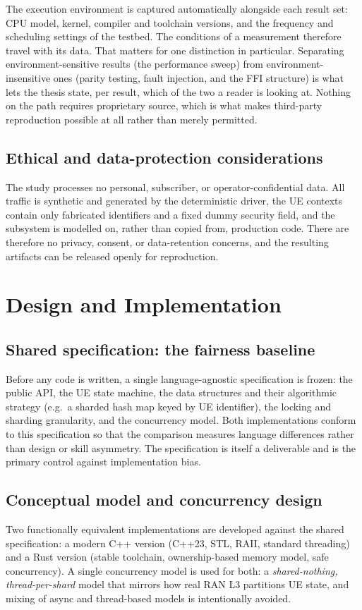 \documentclass[english,twoside,openright,a4paper,censored,csm,software-track-2020]{HYthesisML}
\begin{document}
The execution environment is captured automatically alongside each result set: CPU model,
kernel, compiler and toolchain versions, and the frequency and scheduling settings of the
testbed. The conditions of a measurement therefore travel with its data. That matters for one
distinction in particular. Separating environment-sensitive results (the performance sweep) from
environment-insensitive ones (parity testing, fault injection, and the FFI structure) is what
lets the thesis state, per result, which of the two a reader is looking at. Nothing on the path
requires proprietary source, which is what makes third-party reproduction possible at all rather
than merely permitted.

\section{Ethical and data-protection considerations}
The study processes no personal, subscriber, or operator-confidential data. All traffic is
synthetic and generated by the deterministic driver, the UE contexts contain only fabricated
identifiers and a fixed dummy security field, and the subsystem is modelled on, rather than
copied from, production code. There are therefore no privacy, consent, or data-retention
concerns, and the resulting artifacts can be released openly for reproduction.

\chapter{Design and Implementation\label{chapter:design}}

\section{Shared specification: the fairness baseline}
\label{sec:fairness}
Before any code is written, a single language-agnostic specification is frozen: the public
API, the UE state machine, the data structures and their algorithmic strategy (e.g.\ a
sharded hash map keyed by UE identifier), the locking and sharding granularity, and the
concurrency model. Both implementations conform to this specification so that the comparison
measures language differences rather than design or skill asymmetry. The specification is
itself a deliverable and is the primary control against implementation bias.

\section{Conceptual model and concurrency design}\label{sec:concurrency}
Two functionally equivalent implementations are developed against the shared specification:
a modern C++ version (C++23, STL, RAII, standard threading) and a Rust version (stable
toolchain, ownership-based memory model, safe concurrency). A single concurrency model is
used for both: a \emph{shared-nothing, thread-per-shard} model that mirrors how real RAN L3
partitions UE state, and mixing of async and thread-based models is intentionally avoided.
\end{document}
